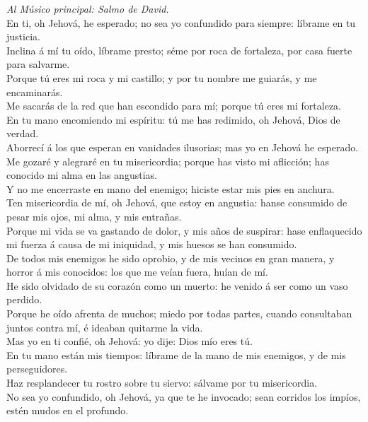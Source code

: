  \emph{Al Músico principal: Salmo de David.}\\
En ti, oh Jehová, he esperado; no sea yo confundido para siempre:
líbrame en tu justicia.\\
 Inclina á mí tu oído, líbrame presto; séme por roca de
fortaleza, por casa fuerte para salvarme.\\
 Porque tú eres mi roca y mi castillo; y por tu nombre me
guiarás, y me encaminarás.\\
 Me sacarás de la red que han escondido para mí; porque tú
eres mi fortaleza.\\
 En tu mano encomiendo mi espíritu: tú me has redimido, oh
Jehová, Dios de verdad.\\
 Aborrecí á los que esperan en vanidades ilusorias; mas yo
en Jehová he esperado.\\
 Me gozaré y alegraré en tu misericordia; porque has visto
mi aflicción; has conocido mi alma en las angustias.\\
 Y no me encerraste en mano del enemigo; hiciste estar mis
pies en anchura.\\
 Ten misericordia de mí, oh Jehová, que estoy en angustia:
hanse consumido de pesar mis ojos, mi alma, y mis entrañas.\\
 Porque mi vida se va gastando de dolor, y mis años de
suspirar: hase enflaquecido mi fuerza á causa de mi iniquidad, y mis
huesos se han consumido.\\
 De todos mis enemigos he sido oprobio, y de mis vecinos en
gran manera, y horror á mis conocidos: los que me veían fuera, huían de
mí.\\
 He sido olvidado de su corazón como un muerto: he venido á
ser como un vaso perdido.\\
 Porque he oído afrenta de muchos; miedo por todas partes,
cuando consultaban juntos contra mí, é ideaban quitarme la vida.\\
 Mas yo en ti confié, oh Jehová: yo dije: Dios mío eres
tú.\\
 En tu mano están mis tiempos: líbrame de la mano de mis
enemigos, y de mis perseguidores.\\
 Haz resplandecer tu rostro sobre tu siervo: sálvame por tu
misericordia.\\
 No sea yo confundido, oh Jehová, ya que te he invocado;
sean corridos los impíos, estén mudos en el profundo.\\
